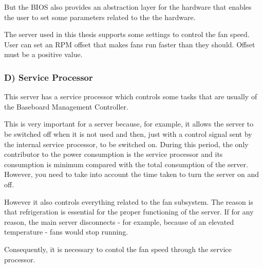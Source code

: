 But the BIOS also provides an abstraction layer for the hardware that enables the user to set some parameters related to the the hardware.

The server used in this thesis supports some settings to control the fan speed. User can set an RPM offset that makes fans run faster than they should. Offset must be a positive value.

\subsubsection{D) Service Processor}

This server has a service processor which controls some tasks that are usually of the Baseboard Management Controller.

This is very important for a server because, for example, it allows the server to be switched off when it is not used and then, just with a control signal sent by the internal service processor, to be switched on. During this period, the only contributor to the power consumption is the service processor and its consumption is minimum compared with the total consumption of the server. However, you need to take into account the time taken to turn the server on and off.

However it also controls everything related to the fan subsystem. The reason is that refrigeration is essential for the proper functioning of the server. If for any reason, the main server disconnects - for example, because of an elevated temperature - fans would stop running.

Consequently, it is necessary to contol the fan speed through the service processor.






